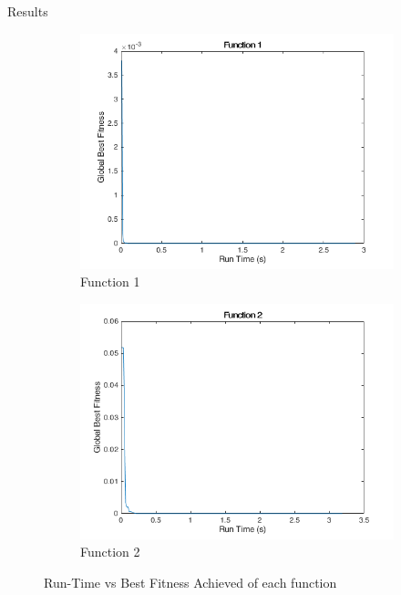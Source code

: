 \documentclass{beamer}
\begin{document}
\begin{frame}{Results}
\begin{figure}
  \begin{subfigure}[b]{0.4\textwidth}
    \includegraphics[width=\textwidth]{img/summary/function1}
    \caption{Function 1}
  \end{subfigure}
  \begin{subfigure}[b]{0.4\textwidth}
    \includegraphics[width=\textwidth]{img/summary/function2}
    \caption{Function 2}
  \end{subfigure}
  \caption{Run-Time vs Best Fitness Achieved of each function}
\end{figure}
\end{frame}
\end{document}
